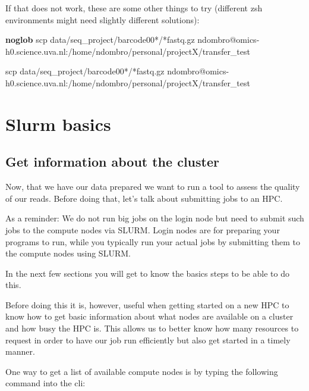 \documentclass[
  letterpaper,
  DIV=11,
  numbers=noendperiod]{scrreprt}
\newenvironment{Shaded}{}{}
\newcommand{\ExtensionTok}[1]{\textcolor[rgb]{0.84,0.23,0.29}{\textbf{#1}}}
\newcommand{\FunctionTok}[1]{\textcolor[rgb]{0.44,0.26,0.76}{#1}}
\newcommand{\NormalTok}[1]{\textcolor[rgb]{0.14,0.16,0.18}{#1}}
\newcommand{\PreprocessorTok}[1]{\textcolor[rgb]{0.84,0.23,0.29}{#1}}
\newcommand{\StringTok}[1]{\textcolor[rgb]{0.01,0.18,0.38}{#1}}
\begin{document}
\begin{tcolorbox}
If that does not work, these are some other things to try (different zsh
environments might need slightly different solutions):

\begin{Shaded}
\begin{Highlighting}[]
\ExtensionTok{noglob}\NormalTok{ scp data/seq\_project/barcode00}\PreprocessorTok{*}\NormalTok{/}\PreprocessorTok{*}\NormalTok{fastq.gz ndombro@omics{-}h0.science.uva.nl:/home/ndombro/personal/projectX/transfer\_test}

\FunctionTok{scp} \StringTok{\textquotesingle{}data/seq\_project/barcode00*/*fastq.gz\textquotesingle{}}\NormalTok{ ndombro@omics{-}h0.science.uva.nl:/home/ndombro/personal/projectX/transfer\_test}
\end{Highlighting}
\end{Shaded}

\end{tcolorbox}

\section{Slurm basics}\label{slurm-basics}

\subsection{Get information about the
cluster}\label{get-information-about-the-cluster}

Now, that we have our data prepared we want to run a tool to assess the
quality of our reads. Before doing that, let's talk about submitting
jobs to an HPC.

As a reminder: We do not run big jobs on the login node but need to
submit such jobs to the compute nodes via SLURM. Login nodes are for
preparing your programs to run, while you typically run your actual jobs
by submitting them to the compute nodes using SLURM.

In the next few sections you will get to know the basics steps to be
able to do this.

Before doing this it is, however, useful when getting started on a new
HPC to know how to get basic information about what nodes are available
on a cluster and how busy the HPC is. This allows us to better know how
many resources to request in order to have our job run efficiently but
also get started in a timely manner.

One way to get a list of available compute nodes is by typing the
following command into the cli:
\end{document}
